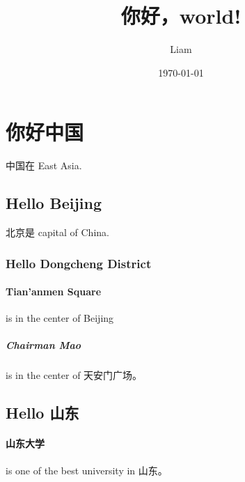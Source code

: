 \documentclass[UTF8]{ctexart}
\title{你好，world!}
\author{Liam}
\date{\today}
\begin{document}
\maketitle
\tableofcontents
\section{你好中国}
中国在 East Asia.
\subsection{Hello Beijing}
北京是 capital of China.
\subsubsection{Hello Dongcheng District}
\paragraph{Tian'anmen Square}
is in the center of Beijing
\subparagraph{Chairman Mao}
is in the center of 天安门广场。
\subsection{Hello 山东}
\paragraph{山东大学} is one of the best university in 山东。
\end{document}
